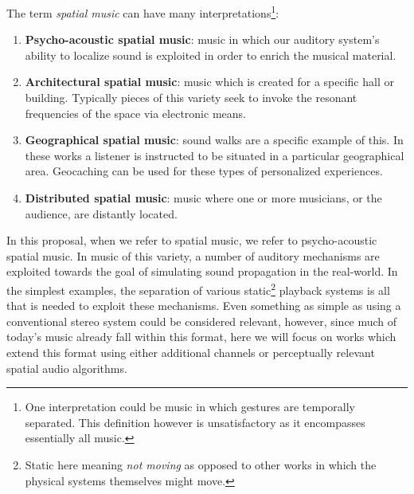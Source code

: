 The term \textit{spatial music} can have many interpretations\footnote{One interpretation could be music in which gestures are temporally separated. This definition however is unsatisfactory as it encompasses essentially all music.}:
\begin{enumerate}
    \item \textbf{Psycho-acoustic spatial music}: music in which our auditory system's ability to localize sound is exploited in order to enrich the musical material. 
    \item \textbf{Architectural spatial music}: music which is created for a specific hall or building. Typically pieces of this variety seek to invoke the resonant frequencies of the space via electronic means. 
    \item \textbf{Geographical spatial music}: sound walks are a specific example of this. In these works a listener is instructed to be situated in a particular geographical area. Geocaching can be used for these types of personalized experiences.
    \item \textbf{Distributed spatial music}: music where one or more musicians, or the audience, are distantly located. 
\end{enumerate}

In this proposal, when we refer to spatial music, we refer to psycho-acoustic spatial music. In music of this variety, a number of auditory mechanisms are exploited towards the goal of simulating sound propagation in the real-world. In the simplest examples, the separation of various static\footnote{Static here meaning \textit{not moving} as opposed to other works in which the physical systems themselves might move.} playback systems is all that is needed to exploit these mechanisms. Even something as simple as using a conventional stereo system could be considered relevant, however, since much of today's music already fall within this format, here we will focus on works which extend this format using either additional channels or perceptually relevant spatial audio algorithms. 

